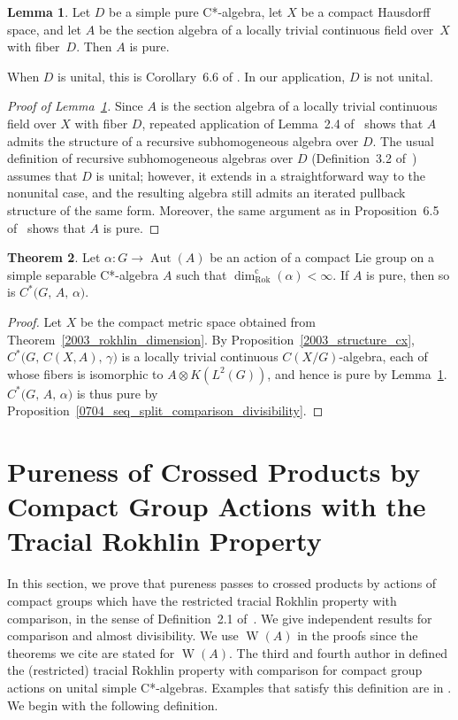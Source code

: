 \documentclass[10pt]{amsart}
\numberwithin{equation}{section}
\theoremstyle{definition}
\newtheorem{thm}{Theorem}[section]
\newtheorem{lem}[thm]{Lemma}
\newcommand{\af}{\alpha}
\newcommand{\gm}{\gamma}
\newcommand{\Aut}{{\operatorname{Aut}}}
\newcommand{\W}{{\operatorname{W}}}
\newcommand{\ca}{C*-algebra}
\newcommand{\ct}{continuous}
\newcommand{\chs}{compact Hausdorff space}
\newcommand{\RD}{{\operatorname{dim}}_{\operatorname{Rok}}^{\operatorname{c}}}
\begin{document}
\begin{lem}\label{L_6327_CtFld}
Let $D$ be a simple pure \ca, let $X$ be a \chs,
and let $A$ be the section algebra of a locally trivial \ct{} field
over~$X$ with fiber~$D$.
Then $A$ is pure.
\end{lem}

When $D$ is unital, this is
Corollary~6.6 of \cite{SethVil}.
In our application, $D$ is not unital.

\begin{proof}[Proof of Lemma~\ref{L_6327_CtFld}]
Since $A$ is the section algebra of a locally trivial continuous field over $X$ with fiber $D$, repeated application of Lemma~2.4 of~\cite{Dad2009} shows that $A$ admits the structure of a recursive subhomogeneous algebra over $D$. The usual definition of recursive subhomogeneous algebras over $D$ (Definition~3.2 of~\cite{ArBcPh2}) assumes that $D$ is unital; however, it extends in a straightforward way to the nonunital case, and the resulting algebra still admits an iterated pullback structure of the same form. Moreover, the same argument as in Proposition~6.5 of~\cite{SethVil} shows that $A$ is pure.
\end{proof}

\begin{thm}\label{T_6325_RDim}
Let $\alpha \colon G \to \Aut (A)$ be an action of a compact Lie group
on a simple separable C*-algebra $A$ such that
$\RD (\alpha) < \infty$.
If $A$ is pure, then so is $C^* \bigl( G, \, A, \, \af \bigr)$.
\end{thm}

\begin{proof}
Let $X$ be the compact metric space
obtained from Theorem~\ref{2003_rokhlin_dimension}.
By Proposition~\ref{2003_structure_cx},
$C^* \bigl( G, \, C(X,A), \, \gm \bigr)$ is a locally trivial
continuous $C (X/G)$-algebra,
each of whose fibers is isomorphic to $A \otimes K(L^2 (G))$,
and hence is pure by Lemma~\ref{L_6327_CtFld}.
$C^* \bigl( G, \, A, \, \af \bigr)$ is thus  pure by
Proposition~\ref{0704_seq_split_comparison_divisibility}.
\end{proof}


\section{Pureness of Crossed Products by Compact Group
 Actions with the Tracial Rokhlin Property}\label{Sec_6326_RTRP}

In this section, we prove that pureness passes to crossed products
by actions of compact groups which have
the restricted tracial Rokhlin property with comparison,
in the sense of Definition~2.1 of~\cite{MohPhil2021TRP}.
We give independent results for comparison and almost divisibility.
We use $\W (A)$ in the proofs since the theorems we cite
are stated for $\W (A)$. The third and fourth author in \cite{MohPhil2021TRP} defined the (restricted) tracial Rokhlin property with comparison for compact group actions on unital simple C*-algebras. Examples that satisfy this definition are in \cite{MohPhil2021TRP2}. We begin with the following definition.
\end{document}
